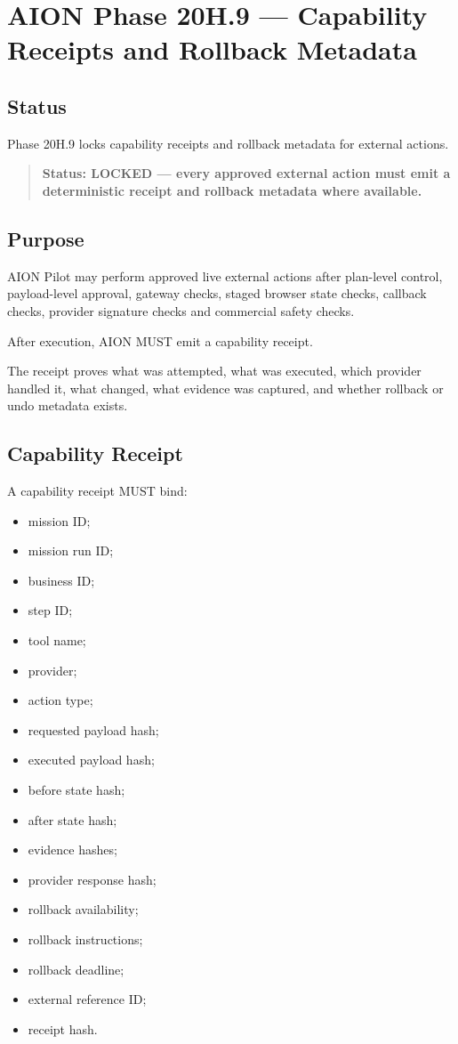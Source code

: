 \section{AION Phase 20H.9 --- Capability Receipts and Rollback Metadata}
\label{sec:aion-phase20h9-capability-receipts}

\subsection{Status}

Phase 20H.9 locks capability receipts and rollback metadata for external actions.

\begin{quote}
\textbf{Status: LOCKED --- every approved external action must emit a deterministic receipt and rollback metadata where available.}
\end{quote}

\subsection{Purpose}

AION Pilot may perform approved live external actions after plan-level control, payload-level approval, gateway checks, staged browser state checks, callback checks, provider signature checks and commercial safety checks.

After execution, AION MUST emit a capability receipt.

The receipt proves what was attempted, what was executed, which provider handled it, what changed, what evidence was captured, and whether rollback or undo metadata exists.

\subsection{Capability Receipt}

A capability receipt MUST bind:

\begin{itemize}
  \item mission ID;
  \item mission run ID;
  \item business ID;
  \item step ID;
  \item tool name;
  \item provider;
  \item action type;
  \item requested payload hash;
  \item executed payload hash;
  \item before state hash;
  \item after state hash;
  \item evidence hashes;
  \item provider response hash;
  \item rollback availability;
  \item rollback instructions;
  \item rollback deadline;
  \item external reference ID;
  \item receipt hash.
\end{itemize}

